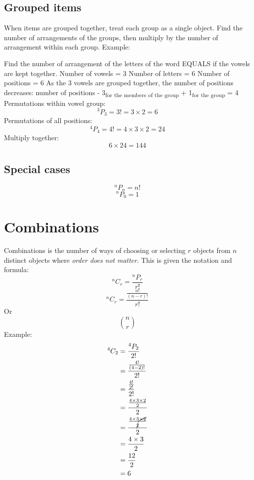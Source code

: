 \documentclass{book}
\begin{document}
\section{Grouped items}
When items are grouped together, treat each group as a single object.  Find the number of arrangements of the groups, then multiply by the number of arrangement within each group.
Example:
\begin{center}
	Find the number of arrangement of the letters of the word EQUALS if the vowels are kept together.
	Number of vowels = 3
	Number of letters = 6
	Number of positions = 6
	As the 3 vowels are grouped together, the number of positions decreases:
	number of positions - 3\textsubscript{for the members of the group} + 1\textsubscript{for the group} = 4
	Permutations within vowel group:
	\[^3P_3 = 3! = 3 \times 2 = 6\]
	Permutations of all positions:
	\[^4P_4 = 4! = 4 \times 3 \times 2 = 24\]
	Multiply together:
	\[6 \times 24 = 144\]
\end{center}

\section{Special cases}
\[^nP_n = n!\]
\[^nP_0 = 1\]

\chapter{Combinations}
Combinations is the number of ways of choosing or selecting $r$ objects from $n$ distinct objects where \emph{order does not matter}.  This is given the notation and formula:
\[^nC_r = \frac{^nP_r}{r!}\]
\[^nC_r = \frac{\frac{n!}{(n-r)!}}{r!}\]
Or
\[
	\binom{n}{r}
\]
Example:
\begin{align*}
	^4C_2 & = \frac{^4P_2}{2!}                                          \\
	      & = \frac{\frac{4!}{(4 - 2)!}}{2!}                            \\
	      & = \frac{\frac{4!}{2!}}{2!}                                  \\
	      & = \frac{\frac{4 \times 3 \times 2}{2}}{2}                   \\
	      & = \frac{\frac{4 \times 3 \cancel{\times 2}}{\cancel{2}}}{2} \\
	      & = \frac{4 \times 3}{2}                                      \\
	      & = \frac{12}{2}                                              \\
	      & = 6                                                         \\
\end{align*}
\end{document}
